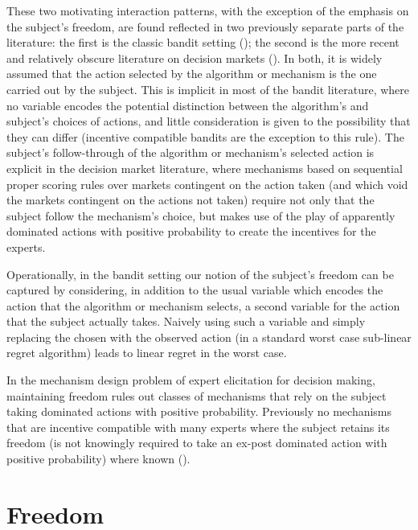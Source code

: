 These two motivating interaction patterns, with the exception of the emphasis on the subject's freedom, are found reflected in two previously separate parts of the literature: the first is the classic bandit setting (\cite{thompson:33,bubeck:12}); the second is the more recent and relatively obscure literature on decision markets (\cite{berg2003prediction,hanson2002decision,othman2010decision,boutilier2012eliciting,chen2014eliciting}). In both, it is widely assumed that the action selected by the algorithm or mechanism is the one carried out by the subject. This is implicit in most of the bandit literature, where no variable encodes the potential distinction between the algorithm's and subject's choices of actions, and little consideration is given to the possibility that they can differ (incentive compatible bandits are the exception to this rule). The subject's follow-through of the algorithm or mechanism's selected action is explicit in the decision market literature, where mechanisms based on sequential proper scoring rules over markets contingent on the action taken (and which void the markets contingent on the actions not taken) require not only that the subject follow the mechanism's choice, but makes use of the play of apparently dominated actions with positive probability to create the incentives for the experts.

Operationally, in the bandit setting our notion of the subject's freedom can be captured by considering, in addition to the usual variable which encodes the action that the algorithm  or mechanism selects, a second variable for the action that the subject actually takes. Naively using such a variable and simply replacing the chosen with the observed action (in a standard worst case sub-linear regret algorithm) leads to linear regret in the worst case.

In the mechanism design problem of expert elicitation for decision making, maintaining freedom rules out classes of mechanisms that rely on the subject taking dominated actions with positive probability. Previously no mechanisms that are incentive compatible with many experts where the subject retains its freedom (is not knowingly required to take an ex-post dominated action with positive probability) where known (\cite{othman2010decision,chen2014eliciting}).



\section{Freedom}


